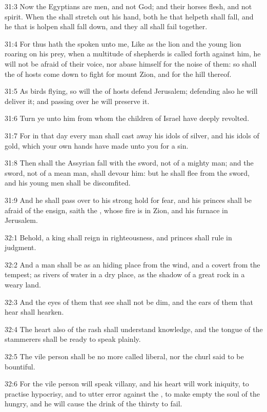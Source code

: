 31:3 Now the Egyptians are men, and not God; and their horses flesh,
and not spirit. When the \LORD shall stretch out his hand, both he that
helpeth shall fall, and he that is holpen shall fall down, and they
all shall fail together.

31:4 For thus hath the \LORD spoken unto me, Like as the lion and the
young lion roaring on his prey, when a multitude of shepherds is
called forth against him, he will not be afraid of their voice, nor
abase himself for the noise of them: so shall the \LORD of hosts come
down to fight for mount Zion, and for the hill thereof.

31:5 As birds flying, so will the \LORD of hosts defend Jerusalem;
defending also he will deliver it; and passing over he will preserve
it.

31:6 Turn ye unto him from whom the children of Israel have deeply
revolted.

31:7 For in that day every man shall cast away his idols of silver,
and his idols of gold, which your own hands have made unto you for a
sin.

31:8 Then shall the Assyrian fall with the sword, not of a mighty man;
and the sword, not of a mean man, shall devour him: but he shall flee
from the sword, and his young men shall be discomfited.

31:9 And he shall pass over to his strong hold for fear, and his
princes shall be afraid of the ensign, saith the \LORD, whose fire is
in Zion, and his furnace in Jerusalem.

32:1 Behold, a king shall reign in righteousness, and princes shall
rule in judgment.

32:2 And a man shall be as an hiding place from the wind, and a covert
from the tempest; as rivers of water in a dry place, as the shadow of
a great rock in a weary land.

32:3 And the eyes of them that see shall not be dim, and the ears of
them that hear shall hearken.

32:4 The heart also of the rash shall understand knowledge, and the
tongue of the stammerers shall be ready to speak plainly.

32:5 The vile person shall be no more called liberal, nor the churl
said to be bountiful.

32:6 For the vile person will speak villany, and his heart will work
iniquity, to practise hypocrisy, and to utter error against the \LORD,
to make empty the soul of the hungry, and he will cause the drink of
the thirsty to fail.

